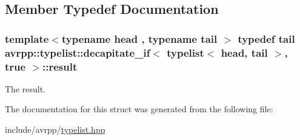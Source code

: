 \subsection{Member Typedef Documentation}
\hypertarget{structavrpp_1_1typelist_1_1decapitate__if_3_01typelist_3_01head_00_01tail_01_4_00_01true_01_4_a3a4f8c2b5ce31c0827cf9f6645553fae}{
\subsubsection[{result}]{\setlength{\rightskip}{0pt plus 5cm}template$<$typename head , typename tail $>$ typedef tail avrpp::typelist::decapitate\_\-if$<$ {\bf typelist}$<$ head, tail $>$, true $>$::{\bf result}}}
\label{structavrpp_1_1typelist_1_1decapitate__if_3_01typelist_3_01head_00_01tail_01_4_00_01true_01_4_a3a4f8c2b5ce31c0827cf9f6645553fae}


The result. 



The documentation for this struct was generated from the following file:\begin{DoxyCompactItemize}
\item 
include/avrpp/\hyperlink{typelist_8hpp}{typelist.hpp}\end{DoxyCompactItemize}
